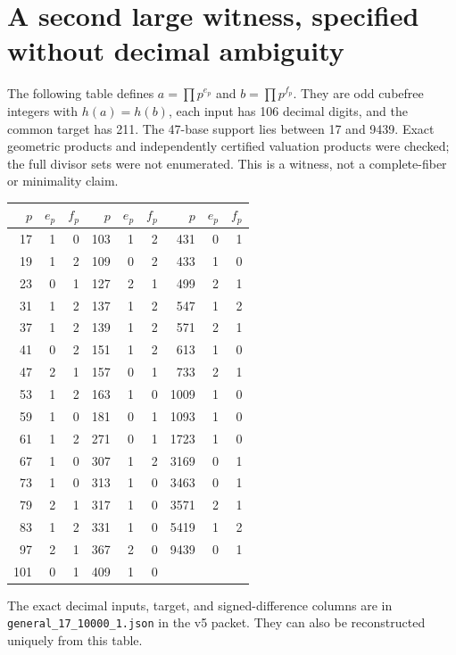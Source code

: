 \section{A second large witness, specified without decimal ambiguity}
The following table defines $a=\prod p^{e_p}$ and $b=\prod p^{f_p}$.
They are odd cubefree integers with $h(a)=h(b)$, each input has 106 decimal
digits, and the common target has 211. The 47-base support lies between 17 and
9439. Exact geometric products and independently certified valuation products
were checked; the full divisor sets were not enumerated. This is a witness,
not a complete-fiber or minimality claim.
\begin{center}\small
\begin{tabular}{rrr@{\qquad}rrr@{\qquad}rrr}
\toprule
$p$&$e_p$&$f_p$&$p$&$e_p$&$f_p$&$p$&$e_p$&$f_p$\\\midrule
17&1&0&103&1&2&431&0&1\\
19&1&2&109&0&2&433&1&0\\
23&0&1&127&2&1&499&2&1\\
31&1&2&137&1&2&547&1&2\\
37&1&2&139&1&2&571&2&1\\
41&0&2&151&1&2&613&1&0\\
47&2&1&157&0&1&733&2&1\\
53&1&2&163&1&0&1009&1&0\\
59&1&0&181&0&1&1093&1&0\\
61&1&2&271&0&1&1723&1&0\\
67&1&0&307&1&2&3169&0&1\\
73&1&0&313&1&0&3463&0&1\\
79&2&1&317&1&0&3571&2&1\\
83&1&2&331&1&0&5419&1&2\\
97&2&1&367&2&0&9439&0&1\\
101&0&1&409&1&0&&&\\
\bottomrule
\end{tabular}
\end{center}
The exact decimal inputs, target, and signed-difference columns are in \texttt{general\_17\_10000\_1.json} in the v5 packet. They can also be reconstructed uniquely from this table.
